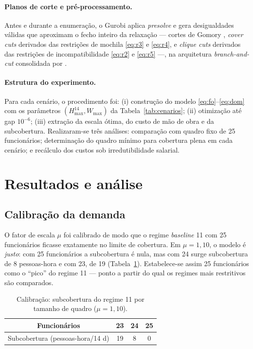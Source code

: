 \documentclass[12pt,a4paper]{article}
\begin{document}
\paragraph{Planos de corte e pré-processamento.} Antes e durante a
enumeração, o Gurobi aplica \emph{presolve} e gera desigualdades válidas que
aproximam o fecho inteiro da relaxação --- cortes de Gomory \cite{gomory1958},
\emph{cover cuts} derivados das restrições de mochila \eqref{eq:r3} e
\eqref{eq:r4}, e \emph{clique cuts} derivados das restrições de
incompatibilidade \eqref{eq:r2} e \eqref{eq:r5} ---, na arquitetura
\emph{branch-and-cut} consolidada por \cite{padberg1991}.

\paragraph{Estrutura do experimento.} Para cada cenário, o procedimento foi:
(i) construção do modelo \eqref{eq:fo}--\eqref{eq:dom} com os parâmetros
$(H_{\max}^{14}, W_{\max})$ da Tabela~\ref{tab:cenarios}; (ii) otimização até
gap $10^{-6}$; (iii) extração da escala ótima, do custo de mão de obra e da
subcobertura. Realizaram-se três análises: comparação com quadro fixo de 25
funcionários; determinação do quadro mínimo para cobertura plena em cada
cenário; e recálculo dos custos sob irredutibilidade salarial.

\section{Resultados e análise}
\label{sec:resultados}

\subsection{Calibração da demanda}
\label{sec:cal}

O fator de escala $\mu$ foi calibrado de modo que o regime \emph{baseline}
11 com 25 funcionários ficasse exatamente no limite de cobertura.
Em $\mu = 1{,}10$, o modelo é \emph{justo}: com 25 funcionários a subcobertura
é nula, mas com 24 surge subcobertura de 8 pessoas-hora e com 23, de 19
(Tabela~\ref{tab:calibracao}). Estabelece-se assim 25 funcionários como o
``pico'' do regime 11 --- ponto a partir do qual os regimes mais
restritivos são comparados.

\begin{table}[htb]
\centering
\caption{Calibração: subcobertura do regime 11 por tamanho de
quadro ($\mu = 1{,}10$).}
\label{tab:calibracao}
\small
\begin{tabular}{cccc}
\toprule
Funcionários & 23 & 24 & 25\\
\midrule
Subcobertura (pessoas-hora/14 d) & 19 & 8 & 0\\
\bottomrule
\end{tabular}
\end{table}
\end{document}
